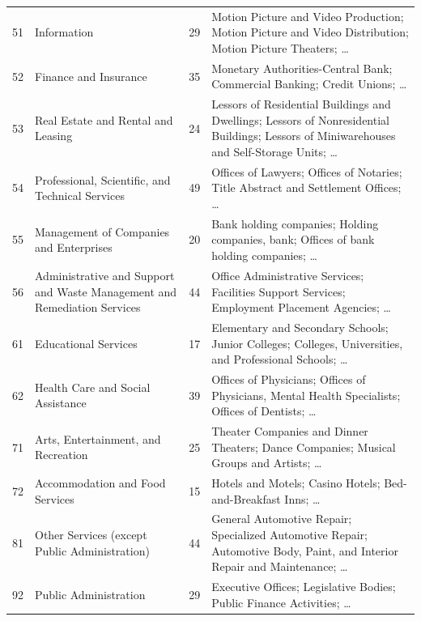 \begin{longtable}{@{}lp{4.3cm}rp{6.0cm}@{}}
51 & Information & 29 & Motion Picture and Video Production; Motion Picture and Video Distribution; Motion Picture Theaters; \dots \\
52 & Finance and Insurance & 35 & Monetary Authorities-Central Bank; Commercial Banking; Credit Unions; \dots \\
53 & Real Estate and Rental and Leasing & 24 & Lessors of Residential Buildings and Dwellings; Lessors of Nonresidential Buildings; Lessors of Miniwarehouses and Self-Storage Units; \dots \\
54 & Professional, Scientific, and Technical Services & 49 & Offices of Lawyers; Offices of Notaries; Title Abstract and Settlement Offices; \dots \\
55 & Management of Companies and Enterprises & 20 & Bank holding companies; Holding companies, bank; Offices of bank holding companies; \dots \\
56 & Administrative and Support and Waste Management and Remediation Services & 44 & Office Administrative Services; Facilities Support Services; Employment Placement Agencies; \dots \\
61 & Educational Services & 17 & Elementary and Secondary Schools; Junior Colleges; Colleges, Universities, and Professional Schools; \dots \\
62 & Health Care and Social Assistance & 39 & Offices of Physicians; Offices of Physicians, Mental Health Specialists; Offices of Dentists; \dots \\
71 & Arts, Entertainment, and Recreation & 25 & Theater Companies and Dinner Theaters; Dance Companies; Musical Groups and Artists; \dots \\
72 & Accommodation and Food Services & 15 & Hotels and Motels; Casino Hotels; Bed-and-Breakfast Inns; \dots \\
81 & Other Services (except Public Administration) & 44 & General Automotive Repair; Specialized Automotive Repair; Automotive Body, Paint, and Interior Repair and Maintenance; \dots \\
92 & Public Administration & 29 & Executive Offices; Legislative Bodies; Public Finance Activities; \dots \\
\end{longtable}
